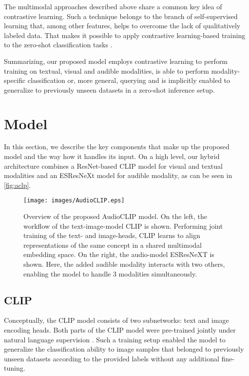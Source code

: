\documentclass[runningheads]{llncs}
\begin{document}
The multimodal approaches described above share a common key idea of contrastive learning.
Such a technique belongs to the branch of self-supervised learning that, among other features, helps to overcome the lack of qualitatively labeled data.
That makes it possible to apply contrastive learning-based training to the zero-shot classification tasks \cite{islam2019soundsemantics,xie2019zero,xie2021zero}.

Summarizing, our proposed model employs contrastive learning to perform training on textual, visual and audible modalities, is able to perform modality-specific classification or, more general, querying and is implicitly enabled to generalize to previously unseen datasets in a zero-shot inference setup.

\section{Model} \label{sec:model}
In this section, we describe the key components that make up the proposed model and the way how it handles its input.
On a high level, our hybrid architecture combines a ResNet-based CLIP model \cite{radford2021clip} for visual and textual modalities and an ESResNeXt model \cite{guzhov2021esrnx} for audible modality, as can be seen in \autoref{fig:aclp}.

\begin{figure}
\texttt{[image: images/AudioCLIP.eps]}
\caption{
Overview of the proposed \mbox{AudioCLIP} model.
On the left, the workflow of the text-image-model \mbox{CLIP} is shown.
Performing joint training of the text- and image-heads, \mbox{CLIP} learns to align representations of the same concept in a shared multimodal embedding space.
On the right, the audio-model \mbox{ESResNeXT} is shown.
Here, the added audible modality interacts with two others, enabling the model to handle 3 modalities simultaneously.
}
\label{fig:aclp}
\end{figure}


\subsection{CLIP} \label{sec:model:clip}
Conceptually, the CLIP model consists of two subnetworks: text and image encoding heads.
Both parts of the CLIP model were pre-trained jointly under natural language supervision \cite{radford2021clip}.
Such a training setup enabled the model to generalize the classification ability to image samples that belonged to previously unseen datasets according to the provided labels without any additional fine-tuning.
\end{document}
